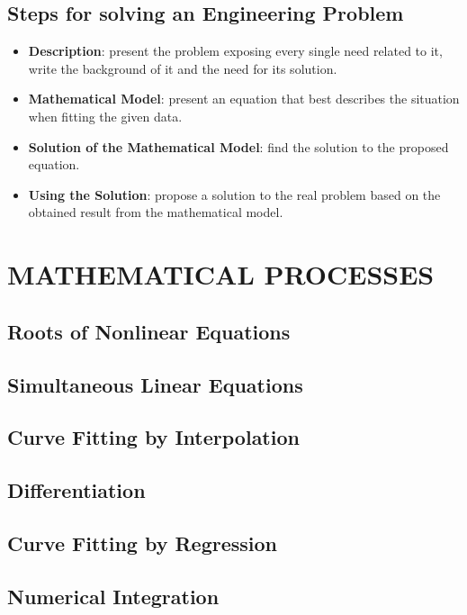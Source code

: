 \documentclass[12pt]{report}
\begin{document}
\section{Steps for solving an Engineering Problem}

\begin{itemize}
\item \textbf{Description}: present the problem exposing every single need related to it, write the background of it and the need for its solution.
\item \textbf{Mathematical Model}: present an equation that best describes the situation when fitting the given data.
\item \textbf{Solution of the Mathematical Model}: find the solution to the proposed equation.
\item \textbf{Using the Solution}: propose a solution to the real problem based on the obtained result from the mathematical model.
\end{itemize}

\chapter{MATHEMATICAL PROCESSES}

\section{Roots of Nonlinear Equations}

\section{Simultaneous Linear Equations}

\section{Curve Fitting by Interpolation}

\section{Differentiation}

\section{Curve Fitting by Regression}

\section{Numerical Integration}
\end{document}
